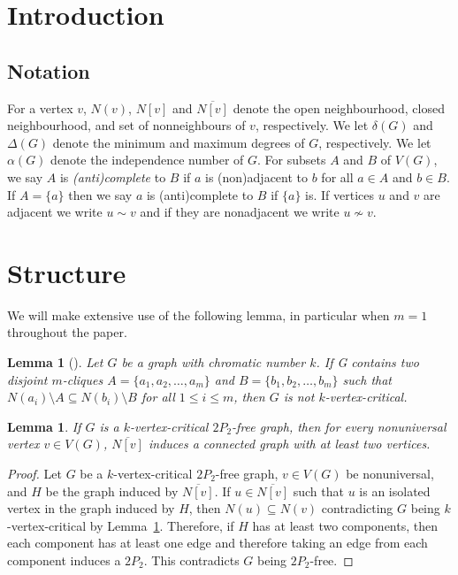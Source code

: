 \documentclass[11pt]{article}
\newtheorem{lemma}[theorem]{Lemma}
\theoremstyle{definition}
\newcommand{\noneighbs}{\overline{N[v]}}
\begin{document}
\section{Introduction}

\cite{KCameron2021}


\subsection{Notation}

For a vertex $v$, $N(v)$, $N[v]$ and $\noneighbs$ denote the open neighbourhood, closed neighbourhood, and set of nonneighbours of $v$, respectively. We let $\delta(G)$ and $\Delta(G)$ denote the minimum and maximum degrees of $G$, respectively. We let $\alpha(G)$ denote the independence number of $G$. For subsets $A$ and $B$ of $V(G)$, we say $A$ is \textit{(anti)complete} to $B$ if $a$ is (non)adjacent to $b$ for all $a\in A$ and $b\in B$. If $A=\{a\}$ then we say $a$ is (anti)complete to $B$ if $\{a\}$ is. If vertices $u$ and $v$ are adjacent we write $u\sim v$ and if they are nonadjacent we write $u\nsim v$.

\section{Structure}

We will make extensive use of the following lemma, in particular when $m=1$ throughout the paper.

\begin{lemma}[\cite{Hoang2015}]\label{lem:nocomparablecliques}
Let $G$ be a graph with chromatic number $k$. If G contains two disjoint $m$-cliques $A = \{a_1, a_2,\ldots , a_m\}$ and $B = \{b_1, b_2,\ldots , b_m\}$ such that $N(a_i) \setminus A \subseteq N(b_i) \setminus B$ for all $1 \le i \le m$, then $G$ is not $k$-vertex-critical.
\end{lemma}




\begin{lemma}\label{lem:2P2freenonneighbconnected}
If $G$ is a $k$-vertex-critical $2P_2$-free graph, then for every nonuniversal vertex $v\in V(G)$,  $\noneighbs$ induces a connected graph with at least two vertices.
\end{lemma}
\begin{proof}
Let $G$ be a $k$-vertex-critical $2P_2$-free graph, $v\in V(G)$ be nonuniversal, and $H$ be the graph induced by $\noneighbs$. If $u\in \noneighbs$ such that $u$ is an isolated vertex in the graph induced by $H$, then $N(u)\subseteq N(v)$ contradicting $G$ being $k$-vertex-critical by Lemma~\ref{lem:nocomparablecliques}. Therefore, if $H$ has at least two components, then each component has at least one edge and therefore taking an edge from each component induces a $2P_2$. This contradicts $G$ being $2P_2$-free. 
\end{proof}
\end{document}
